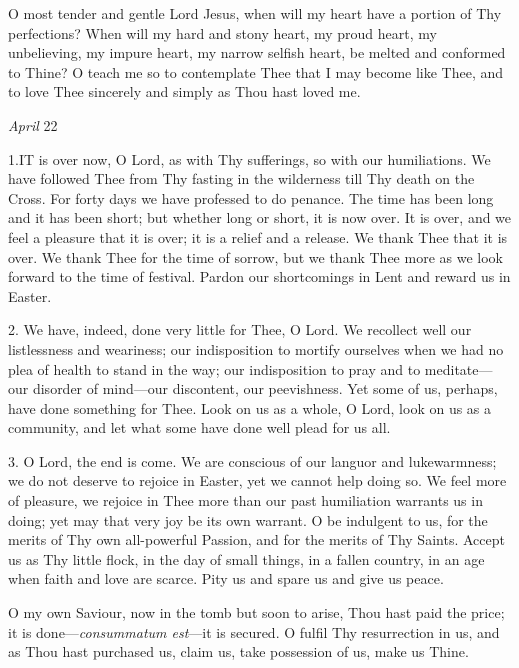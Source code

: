 O most tender and gentle Lord
Jesus, when will my heart have a portion of Thy perfections? When will
my hard and stony heart, my proud heart, my unbelieving, my impure
heart, my narrow selfish heart, be melted and conformed to Thine? O
teach me so to contemplate Thee that I may become like Thee, and to love
Thee sincerely and simply as Thou hast loved me.


\emph{April}
22

1.\emph{}IT
is over now, O Lord, as with Thy sufferings, so with our humiliations.
We have followed Thee from Thy fasting in the wilderness till Thy death
on the Cross. For forty days we have professed to do penance. The time
has been long and it has been short; but whether long or short, it is
now over. It is over, and we feel a pleasure that it is over; it is a
relief and a release. We thank Thee that it is over. We thank Thee for
the time of sorrow, but we thank Thee more as we look forward to the
time of festival. Pardon our shortcomings in Lent and reward us in
Easter.

2. We have, indeed, done very
little for Thee, O Lord. We recollect well our listlessness and
weariness; our indisposition to mortify ourselves when we had no
plea of health to stand in the way; our indisposition to pray and to
meditate—our disorder of mind—our discontent, our peevishness. Yet
some of us, perhaps, have done something for Thee. Look on us as a
whole, O Lord, look on us as a community, and let what some have done
well plead for us all.

3. O Lord, the end is come. We
are conscious of our languor and lukewarmness; we do not deserve to
rejoice in Easter, yet we cannot help doing so. We feel more of
pleasure, we rejoice in Thee more than our past humiliation warrants us
in doing; yet may that very joy be its own warrant. O be indulgent to
us, for the merits of Thy own all-powerful Passion, and for the merits
of Thy Saints. Accept us as Thy little flock, in the day of small
things, in a fallen country, in an age when faith and love are scarce.
Pity us and spare us and give us peace.

O my own Saviour, now in the
tomb but soon to arise, Thou hast paid the price; it is done—\emph{consummatum
est}—it is secured. O fulfil Thy resurrection in us, and as Thou
hast purchased us, claim us, take possession of us, make us Thine.


